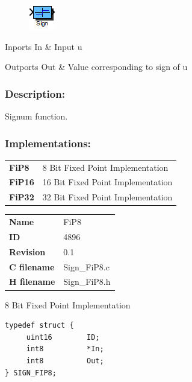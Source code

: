 \label{block:Sign}
\begin{figure}[H]\includegraphics{Sign}\end{figure} 

\begin{XtoCtabular}{Inports}
In & Input u\tabularnewline
\hline
\end{XtoCtabular}


\begin{XtoCtabular}{Outports}
Out & Value corresponding to sign of u\tabularnewline
\hline
\end{XtoCtabular}

\subsubsection*{Description:}
Signum function.


\subsubsection*{Implementations:}
\begin{tabular}{l l}
\textbf{FiP8} & 8 Bit Fixed Point Implementation\tabularnewline
\textbf{FiP16} & 16 Bit Fixed Point Implementation\tabularnewline
\textbf{FiP32} & 32 Bit Fixed Point Implementation\tabularnewline
\end{tabular}

\nopagebreak[0]
\begin{tabular}{l l}
\textbf{Name} & FiP8 \tabularnewline
\textbf{ID} & 4896 \tabularnewline
\textbf{Revision} & 0.1 \tabularnewline
\textbf{C filename} & Sign\_FiP8.c \tabularnewline
\textbf{H filename} & Sign\_FiP8.h \tabularnewline
\end{tabular}
\vspace{1ex}

8 Bit Fixed Point Implementation

\begin{lstlisting}
typedef struct {
     uint16        ID;
     int8          *In;
     int8          Out;
} SIGN_FIP8;
\end{lstlisting}

